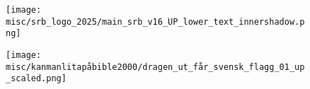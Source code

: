 \begin{figure}[h!]
  \centering
  \begin{adjustbox}{center}
    \texttt{[image: misc/srb\_logo\_2025/main\_srb\_v16\_UP\_lower\_text\_innershadow.png]}
  \end{adjustbox}
\end{figure}

\begin{figure}[h!]
  \centering
  \begin{adjustbox}{center}
    \texttt{[image: misc/kanmanlitapåbible2000/dragen\_ut\_får\_svensk\_flagg\_01\_up\_scaled.png]}
  \end{adjustbox}
\end{figure}

